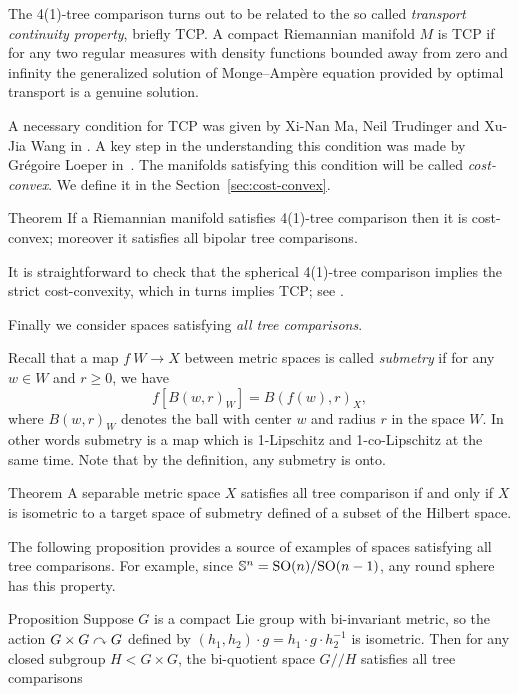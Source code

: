 The 4(1)-tree comparison turns out to be related to the  so called \emph{transport continuity property}, briefly TCP.
A compact Riemannian manifold $M$ is TCP 
if for any two regular measures with density functions bounded away from zero and infinity the generalized solution of Monge--Amp\`{e}re equation provided by optimal transport 
is a genuine solution.



A necessary condition for TCP was given by Xi-Nan Ma, Neil Trudinger and Xu-Jia Wang in \cite{MTW}.
A key step in the understanding this condition was made by Grégoire Loeper in~\cite{loeper}.
The manifolds satisfying this condition will be called \emph{cost-convex}.
We define it in the Section~\ref{sec:cost-convex}.

\begin{thm}{Theorem}\label{T=>CTIL:CTIL}
If a Riemannian manifold satisfies 4(1)-tree comparison then it is cost-convex; moreover it satisfies all bipolar tree comparisons.
\end{thm}

It is straightforward to check that the spherical 4(1)-tree comparison implies the strict cost-convexity, which in turns implies TCP; see \cite{FRV-Nec+Suf}.

Finally we consider spaces satisfying \emph{all tree comparisons}.

Recall that a map $f\:W\to X$ between metric spaces is called \emph{submetry} if for any $w\in W$ and $r\ge 0$, we have 
\[f[B(w,r)_W]=B(f(w),r)_X,\]
where $B(w,r)_W$ denotes the ball with center $w$ and radius $r$ in the space $W$.
In other words submetry is a map which is 1-Lipschitz and 1-co-Lipschitz at the same time.
Note that by the definition, any submetry is onto.

\begin{thm}{Theorem}\label{thm:hilbert-quotient}
A separable metric space $X$ satisfies all tree comparison if and only if
$X$ is isometric to a target space of submetry defined of a subset  of the Hilbert space.
\end{thm}

The following proposition provides a source of examples of spaces satisfying all tree comparisons.
For example, since $\mathbb{S}^n=\mathrm{SO}(n)/\mathrm{SO}(n-1)$, any round sphere has this property.


\begin{thm}{Proposition}\label{prop:group}
Suppose $G$ is a compact Lie group with bi-invariant metric, so the action $G\times G\curvearrowright G$ defined by $(h_1,h_2)\cdot g=h_1\cdot g\cdot  h_2^{-1}$ is isometric. 
Then for any closed subgroup $H<G\times G$, the bi-quotient space $G/\!\!/H$ satisfies all tree comparisons
\end{thm}

